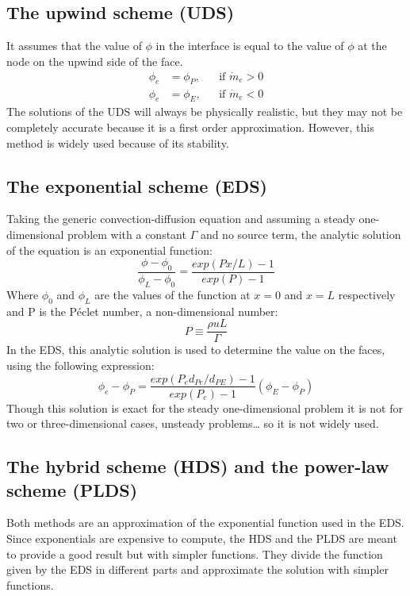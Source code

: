 \subsection{The upwind scheme (UDS)}
It assumes that the value of $\phi$ in the interface is equal to the value of $\phi$ at the node on the upwind side of the face.
\begin{equation}
\begin{aligned}
\phi_ {e} &=\phi_{P},&&\text{if $\dot{m}_{e}>0$}\\    \phi_ {e} &=\phi_{E},&&\text{if $\dot{m}_{e}<0$}
\end{aligned}
\end{equation}
The solutions of the UDS will always be physically realistic, but they may not be completely accurate because it is a first order approximation. However, this method is widely used because of its stability.

\subsection{The exponential scheme (EDS)}
Taking the generic convection-diffusion equation and assuming a steady one-dimensional problem with a constant $\Gamma$ and no source term, the analytic solution of the equation is an exponential function:
\begin{equation}
\frac{\phi-\phi_{0}}{\phi_{L}-\phi_{0}}=\frac{exp\left(Px/L\right)-1}{exp\left(P\right)-1}
\end{equation}
Where $\phi_{0}$ and $\phi_{L}$ are the values of the function at $x=0$ and $x=L$ respectively and P is the Péclet number, a non-dimensional number:
\begin{equation}
P\equiv\frac{\rho uL}{\Gamma}
\end{equation}
In the EDS, this analytic solution is used to determine the value on the faces, using the following expression:
\begin{equation}
\phi_{e}-\phi_{P}=\frac{exp\left(P_{e}d_{Pe}/d_{PE}\right)-1}{exp\left(P_{e}\right)-1}\left(\phi_{E}-\phi_{P}\right)
\end{equation}
Though this solution is exact for the steady one-dimensional problem it is not for two or three-dimensional cases, unsteady problems… so it is not widely used.

\subsection{The hybrid scheme (HDS) and the power-law scheme (PLDS)}
Both methods are an approximation of the exponential function used in the EDS. Since exponentials are expensive to compute, the HDS and the PLDS are meant to provide a good result but with simpler functions. They divide the function given by the EDS in different parts and approximate the solution with simpler functions.